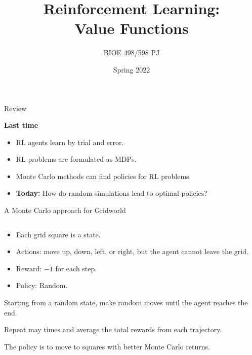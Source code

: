 \documentclass[9pt]{beamer}
\title{Reinforcement Learning:\\Value Functions}
\author{BIOE 498/598 PJ}
\date{Spring 2022}
\newcommand\lspace{\addtolength{\itemsep}{0.5\baselineskip}}
\begin{document}
\frame{\titlepage}

\begin{frame}{Review}

\textbf{Last time}
\begin{itemize}\lspace
	\item RL agents learn by trial and error.
	\item RL problems are formulated as MDPs.
	\item Monte Carlo methods can find policies for RL problems.
	\item<2-> \textbf{Today:} How do random simulations lead to optimal policies?
\end{itemize}
	
\end{frame}

\begin{frame}{A Monte Carlo approach for Gridworld}

\begin{columns}
\begin{column}{0.5\textwidth}
	\begin{itemize}
		\item Each grid square is a state.
		\item Actions: move up, down, left, or right, but the agent cannot leave the grid.
		\item Reward: $-1$ for each step.
		\item Policy: Random.
	\end{itemize}
	
\bigskip
Starting from a random state, make random moves until the agent reaches the end.

\bigskip
Repeat may times and average the total rewards from each trajectory.

\bigskip
The policy is to move to squares with better Monte Carlo returns.
\end{column}


\end{columns}
\end{frame}
\end{document}
